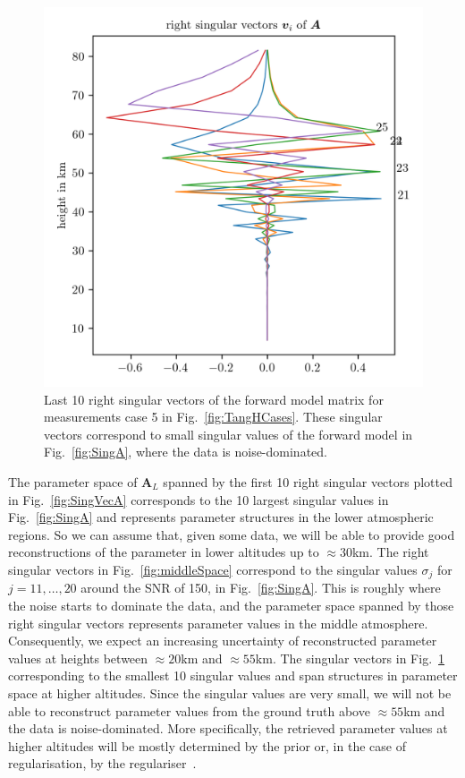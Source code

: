 \begin{figure}[ht!]
	\centering
	\includegraphics{NullVecA.png}
	\caption[Last 10 right singular vectors of forward model.]{Last 10 right singular vectors of the forward model matrix for measurements case 5 in Fig.~\ref{fig:TangHCases}. These singular vectors correspond to small singular values of the forward model in Fig.~\ref{fig:SingA}, where the data is noise-dominated.}
	\label{fig:nullSpace}
\end{figure}
The parameter space of $\bm{A}_L$ spanned by the first 10 right singular vectors plotted in Fig.~\ref{fig:SingVecA} corresponds to the 10 largest singular values in Fig.~\ref{fig:SingA} and represents parameter structures in the lower atmospheric regions.
So we can assume that, given some data, we will be able to provide good reconstructions of the parameter in lower altitudes up to $\approx30$km.
The right singular vectors in Fig.~\ref{fig:middleSpace} correspond to the singular values $\sigma_j$ for $j = 11, \dots, 20$ around the SNR of 150, in Fig.~\ref{fig:SingA}.
This is roughly where the noise starts to dominate the data, and the parameter space spanned by those right singular vectors represents parameter values in the middle atmosphere.
Consequently, we expect an increasing uncertainty of reconstructed parameter values at heights between $\approx20$km and $\approx55$km.
The singular vectors in Fig.~\ref{fig:nullSpace} corresponding to the smallest 10 singular values and span structures in parameter space at higher altitudes.
Since the singular values are very small, we will not be able to reconstruct parameter values from the ground truth above $\approx55$km and the data is noise-dominated.
More specifically, the retrieved parameter values at higher altitudes will be mostly determined by the prior or, in the case of regularisation, by the regulariser~\cite{tan2016LecNot}.

